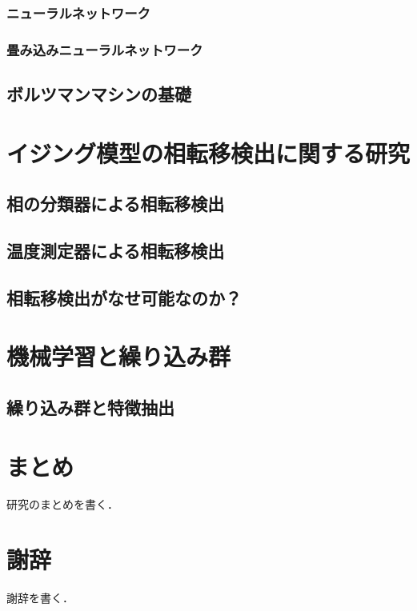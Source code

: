 \documentclass[a4paper,11pt]{jsreport}
\begin{document}
\subsection{ニューラルネットワーク}
\subsection{畳み込みニューラルネットワーク}
\section{ボルツマンマシンの基礎}

\chapter{イジング模型の相転移検出に関する研究}
\section{相の分類器による相転移検出}
\section{温度測定器による相転移検出}
\section{相転移検出がなせ可能なのか？}

\chapter{機械学習と繰り込み群}
\section{繰り込み群と特徴抽出}


\chapter{まとめ}
研究のまとめを書く．

\chapter*{謝辞} %
謝辞を書く．


\renewcommand{\bibname}{参考文献} %
\end{document}
